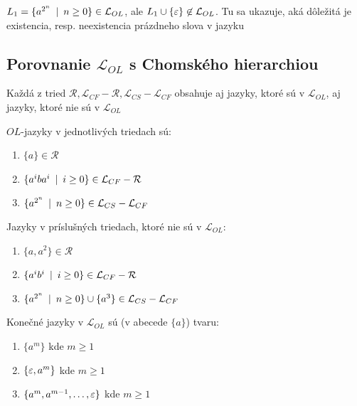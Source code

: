 \begin{poznamka}
    $L_{1}=\{a^{2^{n}}\enspace |\enspace n\geq0\}\in\mathcal{L}_{OL}$, ale
    $L_{1}\cup\{\varepsilon\}\not\in\mathcal{L}_{OL}$. Tu sa ukazuje,
    aká dôležitá je existencia, resp. neexistencia prázdneho slova v
    jazyku
\end{poznamka}

\subsection{Porovnanie $\mathcal{L}_{OL}$ s Chomského hierarchiou}

\begin{veta}
    Každá z tried $\mathcal{R},\mathcal{L}_{CF} - \mathcal{R},
    \mathcal{L}_{CS} - \mathcal{L}_{CF}$ obsahuje aj jazyky, ktoré sú
    v $\mathcal{L}_{OL}$, aj jazyky, ktoré nie sú v $\mathcal{L}_{OL}$
\end{veta}

\begin{dokaz}
    $OL$-jazyky v jednotlivých triedach sú:

    \begin{enumerate}
    \item $\{a\}\in\mathcal{R}$
    \item $\{a^{i}ba^{i}\enspace |\enspace i\geq0\}\in\mathcal{L}_{CF} - \mathcal{R}$
    \item $\{a^{2^{n}}\enspace |\enspace n\geq0\}\in\mathcal{L}_{CS} - \mathcal{L}_{CF}$
    \end{enumerate}

    Jazyky v príslušných triedach, ktoré nie sú v $\mathcal{L}_{OL}$:

    \begin{enumerate}
    \item $\{a,a^{2}\}\in\mathcal{R}$
    \item $\{a^{i}b^{i}\enspace |\enspace i\geq0\}\in\mathcal{L}_{CF} - \mathcal{R}$
    \item $\{a^{2^{n}}\enspace |\enspace n\geq0\}\cup\{a^{3}\}\in\mathcal{L}_{CS}
    - \mathcal{L}_{CF}$
    \end{enumerate}
\end{dokaz}

\begin{poznamka}
    Konečné jazyky v $\mathcal{L}_{OL}$ sú (v abecede $\{a\}$) tvaru:
    \begin{enumerate}
    \item $\{a^{m}\}$ kde $m\geq1$
    \item $\{\varepsilon,a^{m}\}$ kde $m\geq1$
    \item $\{a^{m},a^{m-1},\dots,\varepsilon\}$ kde $m\geq1$
    \end{enumerate}
\end{poznamka}

